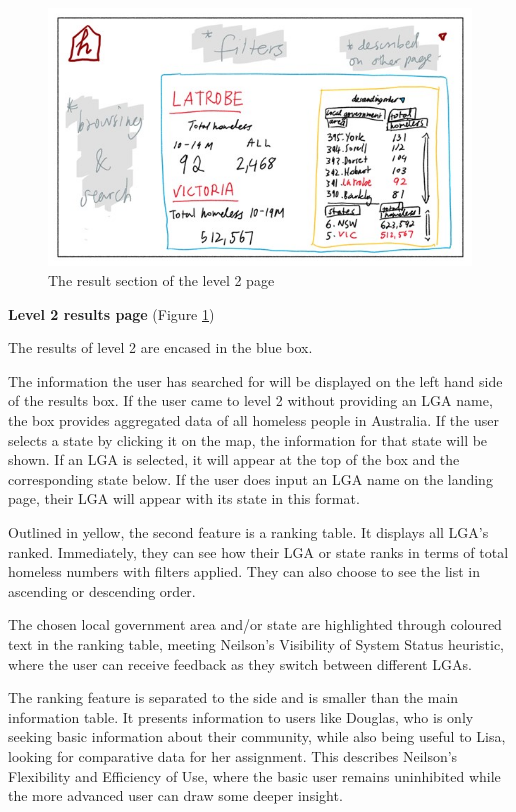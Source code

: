 \documentclass[12pt, a4paper]{article}
\begin{document}
\begin{figure}[h]
\centering
\includegraphics[scale=.9]{level2inner.jpg} 
\caption{The result section of the level 2 page}
\label{fig:2inner}
\end{figure}
\textbf{Level 2 results page} (Figure \ref{fig:2inner}) 

The results of level 2 are encased in the blue box.

The information the user has searched for will be displayed on the left hand side of the results box. If the user came to level 2 without providing an LGA name, the box provides aggregated data of all homeless people in Australia. If the user selects a state by clicking it on the map, the information for that state will be shown. If an LGA is selected, it will appear at the top of the box and the corresponding state below. If the user does input an LGA name on the landing page, their LGA will appear with its state in this format.

Outlined in yellow, the second feature is a ranking table. It displays all LGA's ranked. Immediately, they can see how their LGA or state ranks in terms of total homeless numbers with filters applied. They can also choose to see the list in ascending or descending order.

The chosen local government area and/or state are highlighted through coloured text in the ranking table, meeting Neilson’s Visibility of System Status heuristic, where the user can receive feedback as they switch between different LGAs. 

The ranking feature is separated to the side and is smaller than the main information table. It presents information to users like Douglas, who is only seeking basic information about their community, while also being useful to Lisa, looking for comparative data for her assignment. This describes Neilson’s Flexibility and Efficiency of Use, where the basic user remains uninhibited while the more advanced user can draw some deeper insight.
\end{document}

